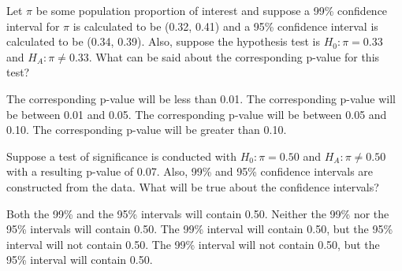 \documentclass{article}
\begin{document}
\begin{mcquestions}
		\question Let $\pi$ be some population proportion of interest and suppose a 99\% confidence interval for $\pi$ is calculated to be (0.32, 0.41) and a 95\% confidence interval is calculated to be (0.34, 0.39). Also, suppose the hypothesis test is $H_0: \pi = 0.33$ and $H_A: \pi \neq 0.33$. What can be said about the corresponding p-value for this test?
		\begin{mcanswerslist}
			\answer The corresponding p-value will be less than 0.01.
			\answer[correct] The corresponding p-value will be between 0.01 and 0.05.
			\answer The corresponding p-value will be between 0.05 and 0.10.
			\answer The corresponding p-value will be greater than 0.10.
		\end{mcanswerslist}
		
		\question Suppose a test of significance is conducted with $H_0: \pi = 0.50$ and $H_A: \pi \neq 0.50$ with a resulting p-value of 0.07.  Also, 99\% and 95\% confidence intervals are constructed from the data.
		What will be true about the confidence intervals?
		\begin{mcanswerslist}
			\answer[correct] Both the 99\% and the 95\% intervals will contain 0.50.
			\answer Neither the 99\% nor the 95\% intervals will contain 0.50.
			\answer The 99\% interval will contain 0.50, but the 95\% interval will not contain 0.50.
			\answer The 99\% interval will not contain 0.50, but the 95\% interval will contain 0.50.
		\end{mcanswerslist}
		
		
	\end{mcquestions}
\end{document}
